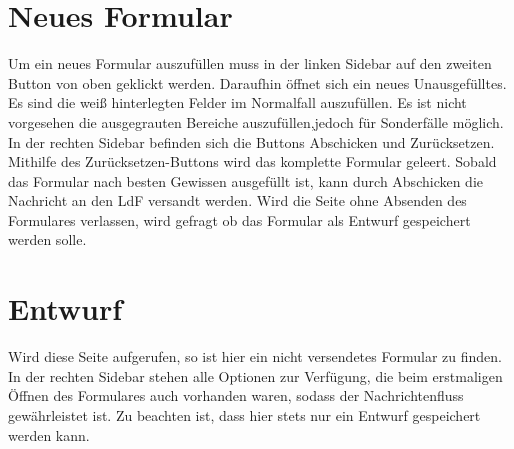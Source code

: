 \documentclass[a4paper,11pt,oneside, titlepage]{article}
\begin{document}
	\section{Neues Formular}
	Um ein neues Formular auszufüllen muss in der linken Sidebar auf den zweiten Button von oben geklickt werden. Daraufhin öffnet sich ein neues Unausgefülltes. Es sind die weiß hinterlegten Felder im Normalfall auszufüllen. Es ist nicht vorgesehen die ausgegrauten Bereiche auszufüllen,jedoch für Sonderfälle möglich.
	\newline
	In der rechten Sidebar befinden sich die Buttons \glqq{}Abschicken\grqq{} und \glqq{}Zurücksetzen\grqq{}.
	Mithilfe des Zurücksetzen-Buttons wird das komplette Formular geleert. Sobald das Formular nach besten Gewissen ausgefüllt ist, kann durch \glqq{} Abschicken \grqq{} die Nachricht an den LdF versandt werden.
	\newline
	Wird die Seite ohne Absenden des Formulares verlassen, wird gefragt ob das Formular als Entwurf gespeichert werden solle.
	
	\section{Entwurf}
	Wird diese Seite aufgerufen, so ist hier ein nicht versendetes Formular zu finden. In der rechten Sidebar stehen alle Optionen zur Verfügung, die beim erstmaligen Öffnen des Formulares auch vorhanden waren, sodass der Nachrichtenfluss gewährleistet ist.
	\newline
	Zu beachten ist, dass hier stets nur ein Entwurf gespeichert werden kann. 
	
\end{document}

